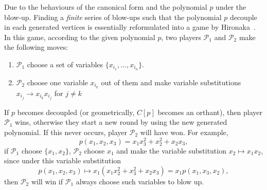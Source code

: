 \documentclass[12pt]{article}
\theoremstyle{definition}
\theoremstyle{plain}
\begin{document}
Due to the behaviours of the canonical form and the polynomial $p$ under the blow-up. Finding a {\it{finite}} series of blow-ups such that the polynomial $p$ decouple in each generated vertices is essentially reformulated into a game by Hironaka~\cite{hironaka1967}. In this game, according to the given polynomial $p$, two players $\mathcal{P}_{1}$ and $\mathcal{P}_{2}$ make the following moves:
\begin{enumerate}
	\item $\mathcal{P}_{1}$ choose a set of variables $\{x_{i_1},\dots,x_{i_n}\}$.
	\item $\mathcal{P}_{2}$ choose one variable $x_{i_k}$ out of them and make variable substitutions  $x_{i_j} \to x_{i_k}x_{i_j}$ for $j\neq k$
\end{enumerate}
If $p$ becomes decoupled (or geometrically, $C[p]$ becomes an orthant), then player $\mathcal{P}_1$ wins, otherwise they start a new round by using the new generated polynomial. If this never occurs, player $\mathcal{P}_{2}$ will have won.
For example, 
\[
	p(x_1,x_2,x_3)=x_1x_3^2+x_2^2+x_2x_3,
\]
if $\mathcal{P}_{1}$ choose $\{x_1,x_2\}$, $\mathcal{P}_{2}$ choose $x_{1}$ and make the variable substitution $x_2\mapsto x_1x_2$, 
since under this variable substitution
\[
	p(x_1,x_2,x_3)\mapsto x_1(x_1x_2^2+x_3^2+x_2x_3)=x_1 p(x_1,x_3,x_2),
\]
then $\mathcal{P}_{2}$ will win if $\mathcal{P}_{1}$ always choose such variables to blow up.


\end{document}
